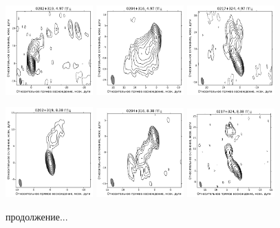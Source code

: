 \begin{figure}
  \includegraphics[width=0.3\textwidth]{0202+319_C.pdf}
  \includegraphics[width=0.3\textwidth]{0204+316_C.pdf}
  \includegraphics[width=0.3\textwidth]{0217+324_C.pdf}


  \includegraphics[width=0.3\textwidth]{0202+319_X.pdf}
  \includegraphics[width=0.3\textwidth]{0204+316_X.pdf}
  \includegraphics[width=0.3\textwidth]{0217+324_X.pdf}

  \caption{продолжение...}
\end{figure}

